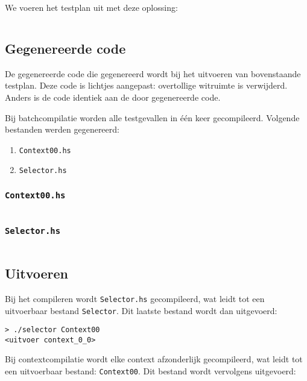 We voeren het testplan uit met deze oplossing:

\inputminted{haskell}{sources/echo-function/correct.hs}

\subsection{Gegenereerde code}\label{subsec:echo-function-haskell-gegenereerde-code}

De gegenereerde code die gegenereerd wordt bij het uitvoeren van bovenstaande testplan.
Deze code is lichtjes aangepast: overtollige witruimte is verwijderd.
Anders is de code identiek aan de door \tested{} gegenereerde code.

Bij batchcompilatie worden alle testgevallen in één keer gecompileerd.
Volgende bestanden werden gegenereerd:

\begin{enumerate}
    \item \texttt{Context00.hs}
    \item \texttt{Selector.hs}
\end{enumerate}

\subsubsection{\texttt{Context00.hs}}

\inputminted{haskell}{sources/echo-function/Context00.hs}

\subsubsection{\texttt{Selector.hs}}

\inputminted{haskell}{sources/echo-function/Selector.hs}

\subsection{Uitvoeren}\label{subsec:echo-function-haskell-uitvoeren}

Bij het compileren wordt \texttt{Selector.hs} gecompileerd, wat leidt tot een uitvoerbaar bestand \texttt{Selector}.
Dit laatste bestand wordt dan uitgevoerd:

\begin{verbatim}
> ./selector Context00
<uitvoer context_0_0>
\end{verbatim}


Bij contextcompilatie wordt elke context afzonderlijk gecompileerd, wat leidt tot een uitvoerbaar bestand: \texttt{Context00}.
Dit bestand wordt vervolgens uitgevoerd:

